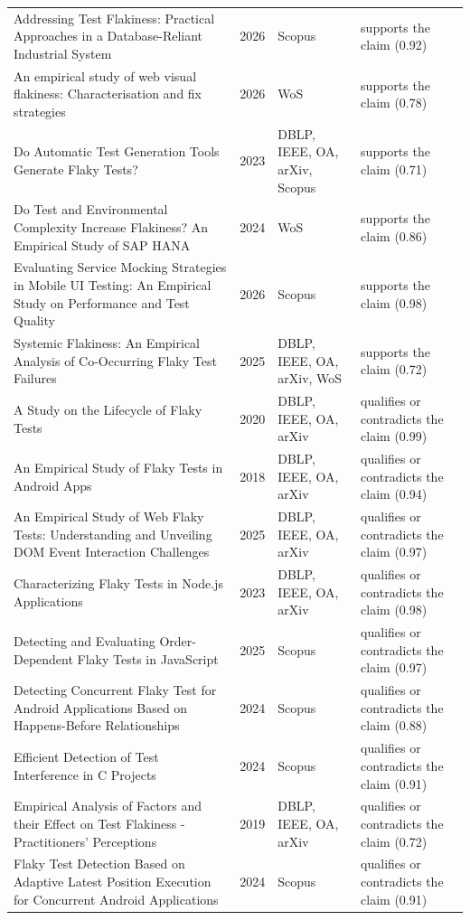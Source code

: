 \begin{longtable}{@{}%
  >{\raggedright\arraybackslash}p{}c%
  >{\raggedright\arraybackslash}p{}%
  >{\raggedright\arraybackslash}p{}@{}}
Addressing Test Flakiness: Practical Approaches in a Database-Reliant Industrial System & 2026 & Scopus & supports the claim (0.92) \\
An empirical study of web visual flakiness: Characterisation and fix strategies & 2026 & WoS & supports the claim (0.78) \\
Do Automatic Test Generation Tools Generate Flaky Tests? & 2023 & DBLP, IEEE, OA, arXiv, Scopus & supports the claim (0.71) \\
Do Test and Environmental Complexity Increase Flakiness? An Empirical Study of SAP HANA & 2024 & WoS & supports the claim (0.86) \\
Evaluating Service Mocking Strategies in Mobile UI Testing: An Empirical Study on Performance and Test Quality & 2026 & Scopus & supports the claim (0.98) \\
Systemic Flakiness: An Empirical Analysis of Co-Occurring Flaky Test Failures & 2025 & DBLP, IEEE, OA, arXiv, WoS & supports the claim (0.72) \\
A Study on the Lifecycle of Flaky Tests & 2020 & DBLP, IEEE, OA, arXiv & qualifies or contradicts the claim (0.99) \\
An Empirical Study of Flaky Tests in Android Apps & 2018 & DBLP, IEEE, OA, arXiv & qualifies or contradicts the claim (0.94) \\
An Empirical Study of Web Flaky Tests: Understanding and Unveiling DOM Event Interaction Challenges & 2025 & DBLP, IEEE, OA, arXiv & qualifies or contradicts the claim (0.97) \\
Characterizing Flaky Tests in Node.js Applications & 2023 & DBLP, IEEE, OA, arXiv & qualifies or contradicts the claim (0.98) \\
Detecting and Evaluating Order-Dependent Flaky Tests in JavaScript & 2025 & Scopus & qualifies or contradicts the claim (0.97) \\
Detecting Concurrent Flaky Test for Android Applications Based on Happens-Before Relationships & 2024 & Scopus & qualifies or contradicts the claim (0.88) \\
Efficient Detection of Test Interference in C Projects & 2024 & Scopus & qualifies or contradicts the claim (0.91) \\
Empirical Analysis of Factors and their Effect on Test Flakiness - Practitioners' Perceptions & 2019 & DBLP, IEEE, OA, arXiv & qualifies or contradicts the claim (0.72) \\
Flaky Test Detection Based on Adaptive Latest Position Execution for Concurrent Android Applications & 2024 & Scopus & qualifies or contradicts the claim (0.91) \\

\end{longtable}

